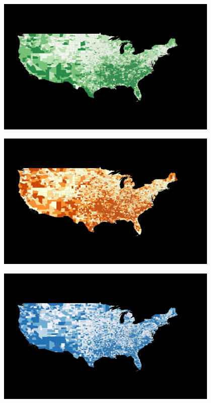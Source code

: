 \documentclass[journal,12pt,onecolumn]{IEEEtran}
\begin{document}
\begin{center}
\centering
\includegraphics[width=0.8\textwidth]{figures/chloro_socioeconomic.PNG}
\label{fig:chlorosocio}
\end{center}

\begin{center}
\centering
\includegraphics[width=0.8\textwidth]{figures/chloro_household_composition.PNG}
\label{fig:chlorocomp}
\end{center}

\begin{center}
\centering
\includegraphics[width=0.8\textwidth]{figures/chloro_transportation.PNG}
\label{fig:chlorotrans}
\end{center}
\end{document}

